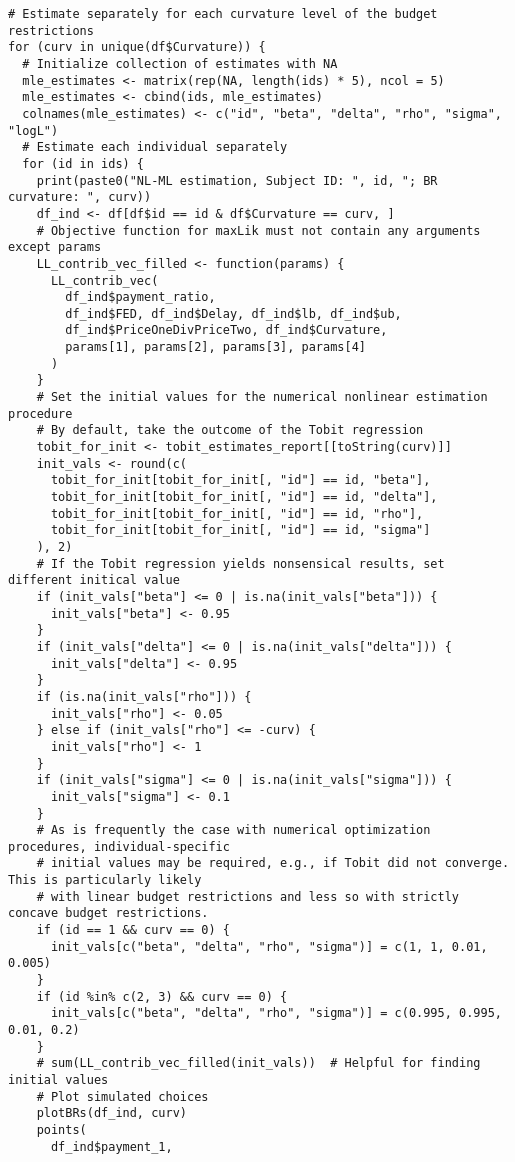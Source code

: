 \documentclass[12pt, a4paper, oneside]{article}
\theoremstyle{Plain}
\theoremstyle{Definition}
\theoremstyle{Remark}
\begin{document}
\begin{appendix}
\begin{lstlisting}
# Estimate separately for each curvature level of the budget restrictions
for (curv in unique(df$Curvature)) {
  # Initialize collection of estimates with NA
  mle_estimates <- matrix(rep(NA, length(ids) * 5), ncol = 5)
  mle_estimates <- cbind(ids, mle_estimates)
  colnames(mle_estimates) <- c("id", "beta", "delta", "rho", "sigma", "logL")
  # Estimate each individual separately
  for (id in ids) {
    print(paste0("NL-ML estimation, Subject ID: ", id, "; BR curvature: ", curv))
    df_ind <- df[df$id == id & df$Curvature == curv, ]
    # Objective function for maxLik must not contain any arguments except params
    LL_contrib_vec_filled <- function(params) {
      LL_contrib_vec(
        df_ind$payment_ratio,
        df_ind$FED, df_ind$Delay, df_ind$lb, df_ind$ub,
        df_ind$PriceOneDivPriceTwo, df_ind$Curvature,
        params[1], params[2], params[3], params[4]
      )
    }
    # Set the initial values for the numerical nonlinear estimation procedure
    # By default, take the outcome of the Tobit regression
    tobit_for_init <- tobit_estimates_report[[toString(curv)]]
    init_vals <- round(c(
      tobit_for_init[tobit_for_init[, "id"] == id, "beta"],
      tobit_for_init[tobit_for_init[, "id"] == id, "delta"],
      tobit_for_init[tobit_for_init[, "id"] == id, "rho"],
      tobit_for_init[tobit_for_init[, "id"] == id, "sigma"]
    ), 2)
    # If the Tobit regression yields nonsensical results, set different initical value
    if (init_vals["beta"] <= 0 | is.na(init_vals["beta"])) {
      init_vals["beta"] <- 0.95
    }
    if (init_vals["delta"] <= 0 | is.na(init_vals["delta"])) {
      init_vals["delta"] <- 0.95
    }
    if (is.na(init_vals["rho"])) {
      init_vals["rho"] <- 0.05
    } else if (init_vals["rho"] <= -curv) {
      init_vals["rho"] <- 1
    }
    if (init_vals["sigma"] <= 0 | is.na(init_vals["sigma"])) {
      init_vals["sigma"] <- 0.1
    }
    # As is frequently the case with numerical optimization procedures, individual-specific
    # initial values may be required, e.g., if Tobit did not converge. This is particularly likely
    # with linear budget restrictions and less so with strictly concave budget restrictions.
    if (id == 1 && curv == 0) {
      init_vals[c("beta", "delta", "rho", "sigma")] = c(1, 1, 0.01, 0.005)
    }
    if (id %in% c(2, 3) && curv == 0) {
      init_vals[c("beta", "delta", "rho", "sigma")] = c(0.995, 0.995, 0.01, 0.2)
    }
    # sum(LL_contrib_vec_filled(init_vals))  # Helpful for finding initial values
    # Plot simulated choices
    plotBRs(df_ind, curv)
    points(
      df_ind$payment_1,

\end{lstlisting}
\end{appendix}
\end{document}
